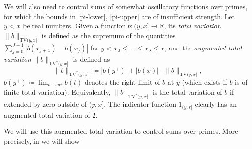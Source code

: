 \documentclass[12pt,a4paper,reqno]{amsart}
\numberwithin{equation}{section}
\theoremstyle{plain}
\theoremstyle{definition}
\newcommand\R{\mathbb{R}}
\begin{document}
We will also need to control sums of somewhat oscillatory functions over primes, for which the bounds in \eqref{pi-lower}, \eqref{pi-upper} are of insufficient strength. Let $y<x$ be real numbers. Given a function $b \colon (y,x] \to \R$, its \emph{total variation}
$\|b\|_{\mathrm{TV}(y,x]}$ is defined as the supremum of the quantities $\sum_{j=0}^{J-1} |b(x_{j+1})-b(x_j)|$ for $y < x_0 \leq \dots \leq x_J \leq x$, and the \emph{augmented total variation} $\|b\|_{\mathrm{TV}^*(y,x]}$ is defined as
$$
\|b\|_{\mathrm{TV}^*(y,x]}
\coloneqq |b(y^+)| + |b(x)| + \|b\|_{\mathrm{TV}(y,x]},$$
$b(y^+) \coloneqq \lim_{t \to y^+} b(t)$ denotes the right limit of $b$ at $y$ (which exists if $b$ is of finite total variation).  Equivalently, $\|b\|_{\mathrm{TV}^*(y,x]}$ is the total variation of $b$ if extended by zero outside of $(y,x]$. The indicator function $1_{(y,x]}$ clearly has an augmented total variation of $2$.

We will use this augmented total variation to control sums over primes.  More precisely, in  we will show
\end{document}
